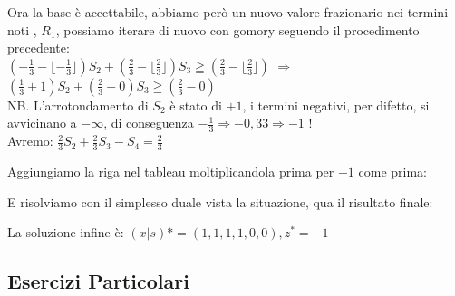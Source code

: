 \documentclass{article}
\begin{document}
Ora la base è accettabile, abbiamo però un nuovo valore frazionario nei termini noti , $R_1$, possiamo iterare di nuovo con gomory seguendo il procedimento precedente:\\

$  ( -\frac{1}{3} - \lfloor - \frac{1}{3} \rfloor )S_2 +  ( \frac{2}{3} - \lfloor \frac{2}{3} \rfloor )S_3 \geqq ( \frac{2}{3} - \lfloor \frac{2}{3} \rfloor )$  $\Rightarrow$  $( \frac{1}{3} + 1 )S_2 +  ( \frac{2}{3} - 0 )S_3 \geqq ( \frac{2}{3} - 0 )$\\
NB. L'arrotondamento di $S_2$ è stato di $+1$, i termini negativi, per difetto, si avvicinano a $- \infty$, di conseguenza $- \frac{1}{3} \Rightarrow -0,33 \Rightarrow -1 $ !\\
Avremo: $\frac{2}{3}S_2 + \frac{2}{3}S_3 -S_4 = \frac{2}{3}$

Aggiungiamo la riga nel tableau moltiplicandola prima per $-1$ come prima:\\

\begin{center}
\end{center}

E risolviamo con il simplesso duale vista la situazione, qua il risultato finale:\\

\begin{center}
\end{center}

La soluzione infine è: $(x|s)*=(1,1,1,1,0,0), z^* = -1$






\subsection{Esercizi Particolari}
\end{document}
